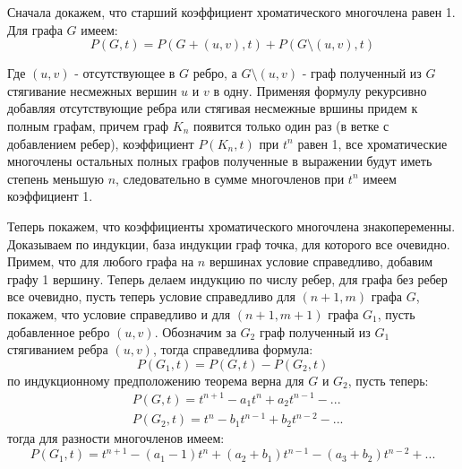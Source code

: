 \documentclass[a4paper,12pt]{article}
\begin{document}
\begin{Solution}
Сначала докажем, что старший коэффициент хроматического многочлена равен 1. Для графа $G$ имеем:
\[
	P\left(G,t\right) = P\left(G+\left(u,v\right),t\right) + P\left(G \setminus \left(u,v\right), t\right)
\]

Где $\left(u,v\right)$ - отсутствующее в $G$ ребро, а $G \setminus \left(u,v\right)$ - граф полученный из $G$ стягивание несмежных вершин $u$ и $v$ в одну. Применяя формулу рекурсивно добавляя отсутствующие ребра или стягивая несмежные вршины придем к полным графам, причем граф $K_n$ появится только один раз (в ветке с добавлением ребер), коэффициент $P\left(K_n, t\right)$ при $t^n$ равен 1, все хроматические многочлены остальных полных графов полученные в выражении будут иметь степень меньшую $n$, следовательно в сумме многочленов при $t^n$ имеем коэффициент 1.

Теперь покажем, что коэффициенты хроматического многочлена знакопеременны. Доказываем по индукции, база индукции граф точка, для которого все очевидно. Примем, что для любого графа на $n$ вершинах условие справедливо, добавим графу 1 вершину. Теперь делаем индукцию по числу ребер, для графа без ребер все очевидно, пусть теперь условие справедливо для $\left(n+1,m\right)$ графа $G$, покажем, что условие справедливо и для $\left(n+1,m+1\right)$ графа $G_1$, пусть добавленное ребро $\left(u,v\right)$. Обозначим за $G_2$ граф полученный из $G_1$ стягиванием ребра $\left(u,v\right)$, тогда справедлива формула:
\[
	P\left(G_1, t\right) = P\left(G,t\right) - P\left(G_2, t\right)
\]
по индукционному предположению теорема верна для $G$ и $G_2$, пусть теперь:
\[
	\begin{split}
		& P\left(G,t\right) = t^{n+1} - a_1 t^{n} + a_2 t^{n-1} - ... \\
		& P\left(G_2,t\right) = t^n - b_1 t^{n-1} + b_2 t^{n-2} - ...
	\end{split}
\]
тогда для разности многочленов имеем:
\[
	P\left(G_1, t\right) = t^{n+1} - \left(a_1 - 1\right) t^n + \left(a_2 + b_1\right) t^{n-1} - \left(a_3 + b_2\right) t^{n-2} + ...
\]
\end{Solution}
\end{document}
